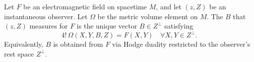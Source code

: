 Let $F$ be an electromagnetic field on spacetime $M$, and let $(z, Z)$ be an instantaneous observer. Let $\Omega$ be the metric volume element on $M$. The  $B$ that $(z, Z)$ measures for $F$ is the unique vector $B \in Z^\perp$ satisfying
$$4! \, \Omega(X, Y, B, Z) = F(X, Y) \quad \forall X, Y \in Z^\perp.$$
Equivalently, $B$ is obtained from $F$ via Hodge duality restricted to the observer's rest space $Z^\perp$.
